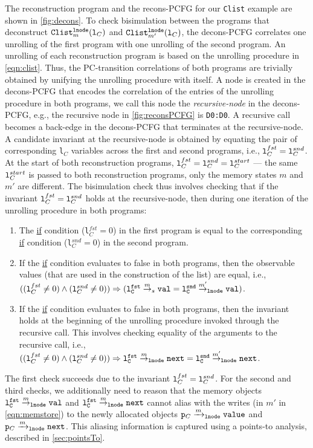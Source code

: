 The reconstruction
program and the recons-PCFG for our {\tt Clist} example
are shown in \cref{fig:decons}.
To check bisimulation
between the programs that deconstruct
${\tt Clist}_m^{{\tt lnode}}({\tt l}_C)$
and ${\tt Clist}_{m'}^{{\tt lnode}}({\tt l}_C)$, the decons-PCFG
correlates one unrolling of the first
program
with one
unrolling of the second program.
An unrolling of each reconstruction
program is based on the unrolling procedure in \cref{eqn:clist}.
Thus, the PC-transition correlations of both programs
are trivially obtained
by unifying the unrolling procedure with itself. A node
is created in the decons-PCFG that
encodes the correlation of the entries of the unrolling procedure in
both programs, we call this node the {\em recursive-node} in the
decons-PCFG, e.g., the
recursive node in \cref{fig:reconsPCFG} is {\tt D0:D0}. A recursive
call becomes a back-edge in the decons-PCFG that terminates at the
recursive-node.
A candidate
invariant at the recursive-node
is obtained by equating the pair of corresponding
{\tt l}$_C$ variables across the first and second
programs, i.e.,
${\tt l}^{fst}_C={\tt l}^{snd}_C$.
At the start of
both reconstruction
programs, ${\tt l}^{fst}_C={\tt l}^{snd}_C={\tt l}^{start}_C$
--- the
same ${\tt l}^{start}_C$ is passed to both reconstruction
programs, only the memory states $m$ and $m'$ are different.
The bisimulation check thus involves checking that
if the invariant
${\tt l}^{fst}_C={\tt l}^{snd}_C$
holds at the recursive-node,
then during one iteration of the unrolling procedure
in both programs:
\begin{enumerate}
\item The \underline{if} condition
({\tt l$^{fst}_C=0$}) in the first program
is equal to the corresponding \underline{if}
condition ({\tt l$^{snd}_C=0$}) in the
second program.
\item If the \underline{if} condition
evaluates to false in both programs, then
the observable values (that are used in the
construction of the list) are equal, i.e.,
$(({\tt l}^{fst}_C\neq 0)\land({\tt l}^{snd}_C\neq 0))\Rightarrow ({\tt {\tt l}^{fst}_C} \overset{m}{\rightarrow}_{s} {\tt val}=
{\tt {\tt l}^{snd}_C} \overset{m'}{\rightarrow}_{\tt lnode} {\tt val})$.
\item If the \underline{if} condition
evaluates to false in both programs, then
the invariant holds at the beginning
of the unrolling procedure invoked through the
recursive call.
This involves checking equality
of the arguments to the recursive call, i.e.,
$(({\tt l}^{fst}_C\neq 0)\land({\tt l}^{snd}_C\neq 0))\Rightarrow {\tt {\tt l}^{fst}_C} \overset{m}{\rightarrow}_{\tt lnode} {\tt next}
=
{\tt {\tt l}^{snd}_C} \overset{m'}{\rightarrow}_{\tt lnode} {\tt next}$.
\end{enumerate}
The first check succeeds due to the invariant
${\tt l}^{fst}_C={\tt l}^{snd}_C$.
For the second and third checks, we additionally
need to reason that the memory objects
${\tt {\tt l}^{fst}_C} \overset{m}{\rightarrow}_{\tt lnode} {\tt val}$ and
${\tt {\tt l}^{fst}_C} \overset{m}{\rightarrow}_{\tt lnode} {\tt next}$ cannot
alias with the writes (in $m'$ in \cref{eqn:memstore})
to the newly allocated objects
${\tt p}_C\xrightarrow[]{m}_{\mathrm{\tt lnode}}{\tt value}$
and
${\tt p}_C\xrightarrow[]{m}_{\mathrm{\tt lnode}}{\tt next}$.
This aliasing information is captured using a points-to analysis,
described in \cref{sec:pointsTo}.


